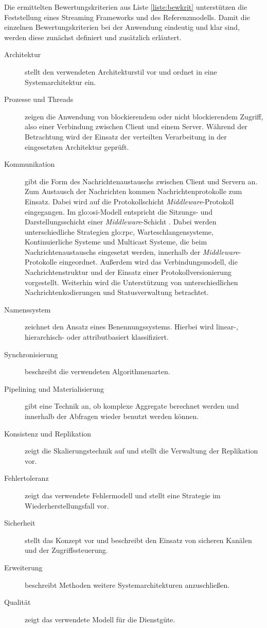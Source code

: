 Die ermittelten Bewertungskriterien aus Liste \ref{liste:bewkrit} unterstützen die Feststellung eines Streaming Frameworks und des Referenzmodells. Damit die einzelnen Bewertungskriterien bei der Anwendung eindeutig und klar sind, werden diese zunächst definiert und zusätzlich erläutert.

\begin{description}
	\item[Architektur] stellt den verwendeten Architekturstil vor und ordnet in eine Systemarchitektur ein.
	\item[Prozesse und Threads] zeigen die Anwendung von blockierendem oder nicht blockierendem Zugriff, also einer Verbindung zwischen Client und einem Server. Während der Betrachtung wird der Einsatz der verteilten Verarbeitung in der eingesetzten Architektur geprüft.
	\item[Kommunikation] gibt die Form des Nachrichtenaustauschs zwischen Client und Servern an. Zum Austausch der Nachrichten kommen Nachrichtenprotokolle zum Einsatz. Dabei wird auf die Protokollschicht \textit{Middleware}-Protokoll eingegangen. Im \acrshort{glo:osi}-Modell entspricht die Sitzungs- und Darstellungsschicht einer \textit{Middleware}-Schicht . Dabei werden unterschiedliche Strategien \gls{glo:rpc}, Warteschlangensysteme, Kontinuierliche Systeme und Multicast Systeme, die beim Nachrichtenaustauschs eingesetzt werden, innerhalb der \textit{Middleware}-Protokolle eingeordnet. Außerdem wird das Verbindungsmodell, die Nachrichtenstruktur und der Einsatz einer Protokollversionierung vorgestellt. Weiterhin wird die Unterstützung von unterschiedlichen Nachrichtenkodierungen und Statusverwaltung betrachtet.
	\item[Namenssystem] zeichnet den Ansatz eines Benennungssystems. Hierbei wird linear-, hierarchisch- oder attributbasiert klassifiziert.
	\item[Synchronisierung] beschreibt die verwendeten Algorithmenarten. 
	\item[Pipelining und Materialisierung] gibt eine Technik an, ob komplexe Aggregate berechnet werden und innerhalb der Abfragen wieder benutzt werden können.
	\item[Konsistenz und Replikation] zeigt die Skalierungstechnik auf und stellt die Verwaltung der Replikation vor. 	
	\item[Fehlertoleranz] zeigt das verwendete Fehlermodell und stellt eine Strategie im Wiederherstellungsfall vor.
	\item[Sicherheit] stellt das Konzept vor und beschreibt den Einsatz von sicheren Kanälen und der Zugriffssteuerung.	
	\item[Erweiterung] beschreibt Methoden weitere Systemarchitekturen anzuschließen.
	\item[Qualität] zeigt das verwendete Modell für die Dienstgüte.
\end{description}

